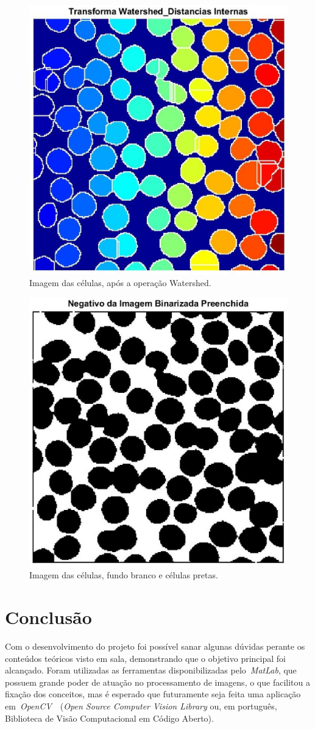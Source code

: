 \documentclass[conference]{Trabalho_2}
\begin{document}
\begin{figure}[!t]
  \centering
  \includegraphics[width = 4.5 cm]{Transforma_Watershed_Distancias_Internas}
  \caption{Imagem das c\'elulas, ap\'os a opera\c{c}\~ao Watershed.}
  \label{fig:prob3.4}
\end{figure}

\begin{figure}[!t]
  \centering
  \includegraphics[width = 4.5 cm]{Negativo_da_Imagem_Binarizada_Preenchida}
  \caption{Imagem das c\'elulas, fundo branco e c\'elulas pretas.}
  \label{fig:prob3.5}
\end{figure}



\section{Conclus\~ao}
Com o desenvolvimento do projeto foi poss\'ivel sanar algunas d\'uvidas perante os conte\'udos te\'oricos visto em sala, demonstrando que o objetivo principal foi alcan\c{c}ado. Foram utilizadas as ferramentas disponibilizadas pelo~\textit{MatLab}, que possuem grande poder de atua\c{c}\~ao no processamento de imagens, o que facilitou a fixa\c{c}\~ao dos conceitos, mas \'e esperado que futuramente seja feita uma aplica\c{c}\~ao em~\textit{OpenCV}~\cite{opencv}~(\textit{Open Source Computer Vision Library} ou, em portugu\^es, Biblioteca de Vis\~ao Computacional em C\'odigo Aberto).





\end{document}
